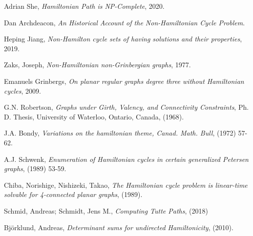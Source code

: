 \documentclass[14pt]{article}
\begin{document}
\begin{spacing}{1.175}
    \begin{thebibliography}{9}
        \item Adrian She, \emph{Hamiltonian Path is NP-Complete}, 2020.
        \item Dan Archdeacon, \emph{An Historical Account of the Non-Hamiltonian Cycle Problem}.
        \item Heping Jiang, \emph{Non-Hamilton cycle sets of having solutions and their properties}, 2019.
        \item Zaks, Joseph, \emph{Non-Hamiltonian non-Grinbergian graphs}, 1977.
        \item Emanuels Grinbergs, \emph{On planar regular graphs degree three without Hamiltonian cycles}, 2009.
        \item G.N. Robertson, \emph{Graphs under Girth, Valency, and Connectivity Constraints}, Ph. D. Thesis, University of Waterloo, Ontario, Canada, (1968).
        \item J.A. Bondy, \emph{Variations on the hamiltonian theme, Canad. Math. Bull}, (1972) 57-62.
        \item A.J. Schwenk, \emph{Enumeration of Hamiltonian cycles in certain generalized Petersen graphs}, (1989) 53-59.
        \item Chiba, Norishige, Nishizeki, Takao, \emph{The Hamiltonian cycle problem is linear-time solvable for 4-connected planar graphs}, (1989).
        \item Schmid, Andreas; Schmidt, Jens M., \emph{Computing Tutte Paths}, (2018)
        \item Björklund, Andreas, \emph{Determinant sums for undirected Hamiltonicity}, (2010).

    \end{thebibliography}


    
	\end{spacing}
 
\end{document}
